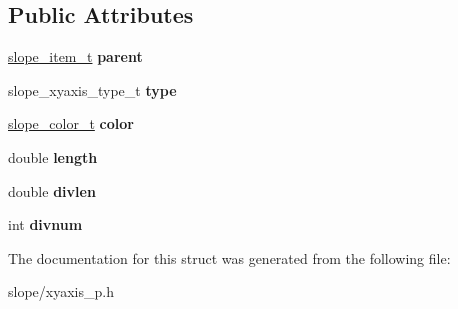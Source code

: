 \subsection*{Public Attributes}
\begin{DoxyCompactItemize}
\item 
\hypertarget{struct__slope__xyaxis_ab53d8e2917569ff2ba7d4df2fdf89d05}{\hyperlink{group__Item_ga2616141f0e164a876049da51ea3a8646}{slope\+\_\+item\+\_\+t} {\bfseries parent}}\label{struct__slope__xyaxis_ab53d8e2917569ff2ba7d4df2fdf89d05}

\item 
\hypertarget{struct__slope__xyaxis_a56aa7533e274304b0391a18a5c1e760c}{slope\+\_\+xyaxis\+\_\+type\+\_\+t {\bfseries type}}\label{struct__slope__xyaxis_a56aa7533e274304b0391a18a5c1e760c}

\item 
\hypertarget{struct__slope__xyaxis_afbee67325cf0615e6897aa608660024f}{\hyperlink{struct__slope__color}{slope\+\_\+color\+\_\+t} {\bfseries color}}\label{struct__slope__xyaxis_afbee67325cf0615e6897aa608660024f}

\item 
\hypertarget{struct__slope__xyaxis_a6a1eecc666de23bfd52da363a8452ac5}{double {\bfseries length}}\label{struct__slope__xyaxis_a6a1eecc666de23bfd52da363a8452ac5}

\item 
\hypertarget{struct__slope__xyaxis_a815c7ca4b34489e3f85cfb3b0272bd55}{double {\bfseries divlen}}\label{struct__slope__xyaxis_a815c7ca4b34489e3f85cfb3b0272bd55}

\item 
\hypertarget{struct__slope__xyaxis_addc6da873f46da73c1233d2343ed92b9}{int {\bfseries divnum}}\label{struct__slope__xyaxis_addc6da873f46da73c1233d2343ed92b9}

\end{DoxyCompactItemize}


The documentation for this struct was generated from the following file\+:\begin{DoxyCompactItemize}
\item 
slope/xyaxis\+\_\+p.\+h\end{DoxyCompactItemize}
